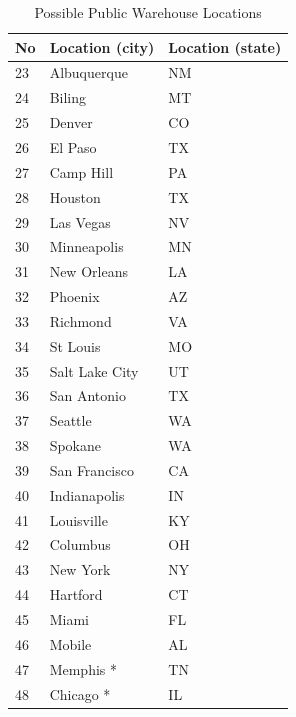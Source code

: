 \documentclass[12pt,a4paper]{article}
\begin{document}
\begin{table}[!h]
    \centering
    \caption{Possible Public Warehouse Locations}
    \label{tab:tabela2-enunciado}
    \begin{tabular}{|l|l|l|}
    \hline
    No & Location (city) & Location (state) \\
    \hline
    23 & Albuquerque     & NM               \\
    24 & Biling          & MT               \\
    25 & Denver          & CO               \\
    26 & El Paso         & TX               \\
    27 & Camp Hill       & PA               \\
    28 & Houston         & TX               \\
    29 & Las Vegas       & NV               \\
    30 & Minneapolis     & MN               \\
    31 & New Orleans     & LA               \\
    32 & Phoenix         & AZ               \\
    33 & Richmond        & VA               \\
    34 & St Louis        & MO               \\
    35 & Salt Lake City  & UT               \\
    36 & San Antonio     & TX               \\
    37 & Seattle         & WA               \\
    38 & Spokane         & WA               \\
    39 & San Francisco   & CA               \\
    40 & Indianapolis    & IN               \\
    41 & Louisville      & KY               \\
    42 & Columbus        & OH               \\
    43 & New York        & NY               \\
    44 & Hartford        & CT               \\
    45 & Miami           & FL               \\
    46 & Mobile          & AL               \\
    47 & Memphis *       & TN               \\
    48 & Chicago *       & IL               \\
    \hline
\end{tabular}
\end{table}
\end{document}
